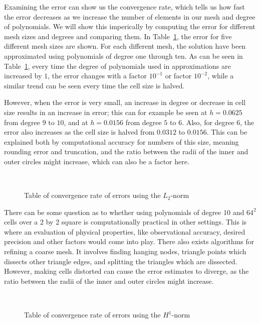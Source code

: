 Examining the error can show us the 
convergence rate, which tells us how fast the error decreases as we increase the number of elements in our mesh and degree of polynomials.
We will show this imperically by computing the error for different mesh sizes and degrees and comparing them. 
In Table~\ref{tab:convergence_l2}, 
the error for five different mesh sizes are shown. 
For each different mesh, the solution have been approximated using polynomials of degree one through ten.
As can be seen in Table~\ref{tab:convergence_l2}, every time the degree of polynomials used in 
approximations are increased by $1$, the error changes with a factor $10^{-1}$ or factor 
$10^{-2}$, while a similar trend can be seen every time the cell size is halved. 

However, when the error is very small, an increase in degree or decrease in cell size results in 
an increase in error; this can for example be seen at $h=0.0625$ from degree $9$ to $10$, and 
at $h=0.0156$ from degree $5$ to $6$. 
Also, for degree $6$, the error also increases as the cell size is halved from $0.0312$ to $0.0156$.
This can be explained both by computational accuracy for 
numbers of this size, meaning rounding error and truncation, and the ratio between the radii of the
inner and outer circles might increase, which can also be a factor here.
\begin{figure}[ht]
    \center~
    \caption{Table of convergence rate of errors using the $L_2$-norm}\label{tab:convergence_l2}
\end{figure}
There can be some question as to whether using polynomials of degree $10$ and $64^2$ cells over a 
$2$ by $2$ square is computationally practical in other settings. 
This is where an evaluation of physical properties, like observational accuracy, desired precision and other 
factors would come into play.
There also exists algorithms for refining a coarse mesh. It involves finding hanging nodes, triangle 
points which dissects other triangle edges, and splitting the triangles which are dissected. 
However, making cells distorted can cause the error estimates to diverge, as the ratio between the radii of the
inner and outer circles might increase.
\begin{figure}[ht]
    \center~
    \caption{Table of convergence rate of errors using the $H^1$-norm}
    \label{tab:convergence_H1}
\end{figure}
